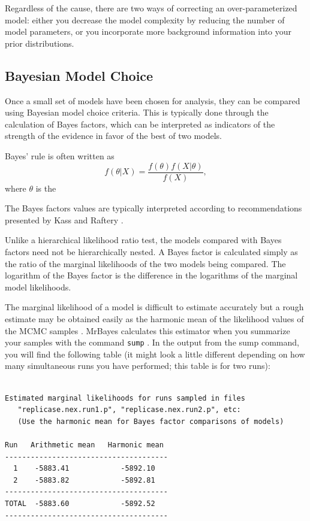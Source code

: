 \documentclass[12pt]{book}
\newcommand{\ttt}[1]{\texttt{#1} }
\begin{document}
Regardless of the cause, there are two ways of correcting an over-parameterized model: either you
decrease the model complexity by reducing the number of model parameters, or you incorporate more
background information into your prior distributions.

\subsection{Bayesian Model Choice}
Once a small set of models have been chosen for analysis, they can be compared using Bayesian model
choice criteria. This is typically done through the calculation of Bayes factors, which can be
interpreted as indicators of the strength of the evidence in favor of the best of two models.

Bayes' rule is often written as
$$
f(\theta|X) = \frac{f(\theta)f(X|\theta)}{f(X)},
$$
where $\theta$ is the 


The Bayes factors values are typically interpreted according to recommendations presented by Kass
and Raftery \citep{kass95}.

Unlike a hierarchical likelihood ratio test, the models compared with Bayes factors need not be
hierarchically nested. A Bayes factor is calculated simply as the ratio of the marginal likelihoods
of the two models being compared. The logarithm of the Bayes factor is the difference in the
logarithms of the marginal model likelihoods.

The marginal likelihood of a model is difficult to estimate accurately but a rough estimate may be
obtained easily as the harmonic mean of the likelihood values of the MCMC samples \citep{newton94}.
MrBayes calculates this estimator when you summarize your samples with the command \ttt{sump}. In
the output from the sump command, you will find the following table (it might look a little
different depending on how many simultaneous runs you have performed; this table is for two runs):

\begin{singlespacing}
\small
\begin{verbatim}

Estimated marginal likelihoods for runs sampled in files
   "replicase.nex.run1.p", "replicase.nex.run2.p", etc:
   (Use the harmonic mean for Bayes factor comparisons of models)

Run   Arithmetic mean   Harmonic mean
--------------------------------------
  1    -5883.41            -5892.10
  2    -5883.82            -5892.81
--------------------------------------
TOTAL  -5883.60            -5892.52
--------------------------------------
\end{verbatim}
\normalsize
\end{singlespacing}
\end{document}
